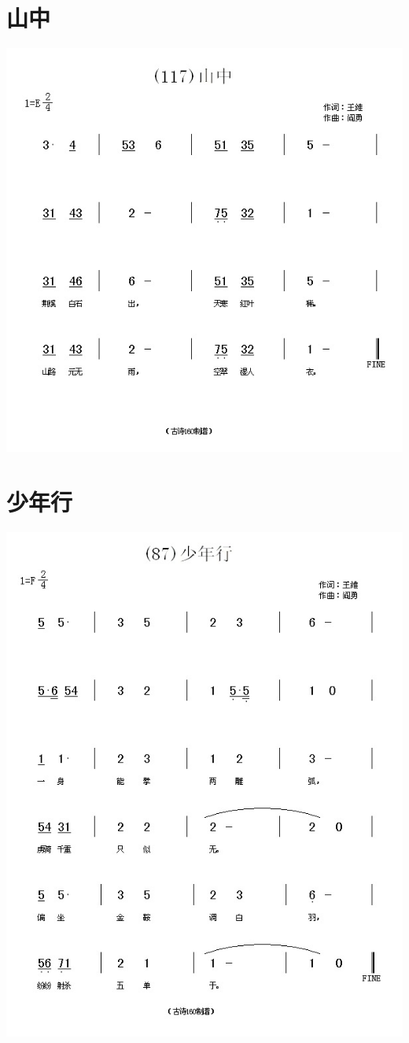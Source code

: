 \documentclass[cn,pad,chinesefont=nofont]{elegantbook}
\begin{document}
\section{山中}
    \includegraphics[width=\textwidth]{dongxiao/20200627-王维-山中.jpg} 
\section{少年行}
    \includegraphics[width=\textwidth]{dongxiao/20200627-王维-少年行.jpg} 
\end{document}
